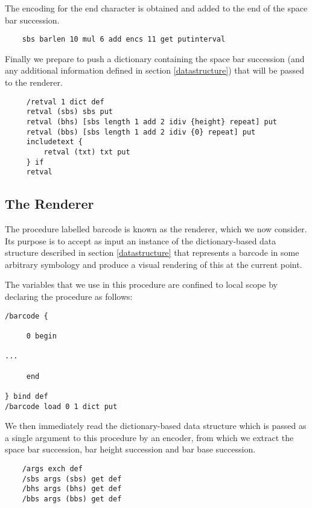 \documentclass{article}
\begin{document}
The encoding for the end character is obtained and added to 
the end of the space bar succession.

\begin{lstlisting}
    sbs barlen 10 mul 6 add encs 11 get putinterval
\end{lstlisting}

Finally we prepare to push a dictionary containing the space bar 
succession (and any additional information defined in section
\ref{datastructure}) that will be passed to the renderer.

\begin{lstlisting}
     /retval 1 dict def
     retval (sbs) sbs put
     retval (bhs) [sbs length 1 add 2 idiv {height} repeat] put
     retval (bbs) [sbs length 1 add 2 idiv {0} repeat] put
     includetext {
         retval (txt) txt put
     } if
     retval
\end{lstlisting}


\subsection{The Renderer}

The procedure labelled barcode is known as the renderer, which we now
consider. Its purpose is to accept as input an instance of the
dictionary-based data structure described in section
\ref{datastructure} that represents a barcode in some arbitrary
symbology and produce a visual rendering of this at the current
point.

The variables that we use in this procedure are confined to local
scope by declaring the procedure as follows:

\begin{lstlisting}
/barcode {
 
     0 begin

...

     end

} bind def
/barcode load 0 1 dict put
\end{lstlisting}

We then immediately read the dictionary-based data structure which 
is passed as a single argument to this procedure by an encoder, from
which we extract the space bar succession, bar height succession and bar
base succession.

\begin{lstlisting}
    /args exch def
    /sbs args (sbs) get def
    /bhs args (bhs) get def
    /bbs args (bbs) get def
\end{lstlisting}
\end{document}
